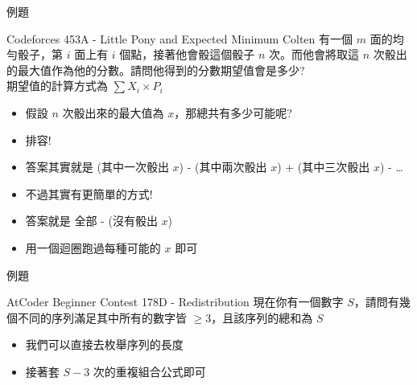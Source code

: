 \documentclass[aspectratio=169]{beamer}
\begin{document}
\begin{frame}{例題}
    \begin{block}{Codeforces 453A - Little Pony and Expected Minimum}
        Colten 有一個 $m$ 面的均勻骰子，第 $i$ 面上有 $i$ 個點，接著他會骰這個骰子 $n$ 次。而他會將取這 $n$ 次骰出的最大值作為他的分數。請問他得到的分數期望值會是多少? \\
        \vspace{5mm}
        期望值的計算方式為 $\sum X_i \times P_i$
    \end{block} \pause
    \begin{itemize}
        \item<1-> 假設 $n$ 次骰出來的最大值為 $x$，那總共有多少可能呢?
        \item<2-> 排容! 
        \item<3-> 答案其實就是 (其中一次骰出 $x$) - (其中兩次骰出 $x$) + (其中三次骰出 $x$) - \dots
        \item<4-> 不過其實有更簡單的方式! 
        \item<4-> 答案就是 全部 - (沒有骰出 $x$)
        \item<5-> 用一個迴圈跑過每種可能的 $x$ 即可
    \end{itemize}
\end{frame}

\begin{frame}{例題}
    \begin{block}{AtCoder Beginner Contest 178D - Redistribution}
        現在你有一個數字 $S$，請問有幾個不同的序列滿足其中所有的數字皆 $\ge 3$，且該序列的總和為 $S$
    \end{block} \pause
    \begin{itemize}
        \item 我們可以直接去枚舉序列的長度
        \item 接著套 $S-3$ 次的重複組合公式即可
    \end{itemize}
\end{frame}
\end{document}
